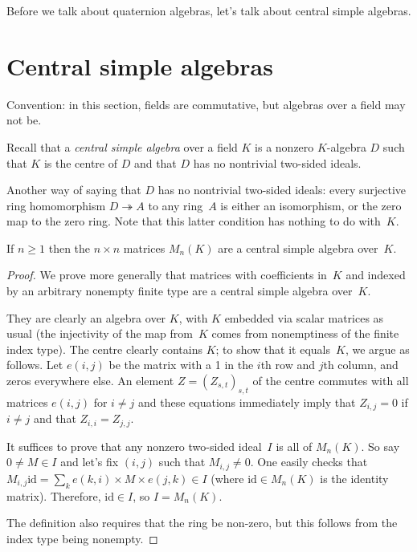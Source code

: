Before we talk about quaternion algebras, let's talk about central simple algebras.

\section{Central simple algebras}

Convention: in this section, fields are commutative, but algebras over a field may not be.

Recall that a \emph{central simple algebra} over a field $K$ is a
nonzero $K$-algebra $D$ such that $K$ is the
centre of $D$ and that $D$ has no nontrivial two-sided ideals.

Another way of saying that $D$ has no nontrivial two-sided ideals: every surjective ring
homomorphism $D\twoheadrightarrow A$ to any ring~$A$ is either an isomorphism, or the zero map
to the zero ring. Note that this latter condition
has nothing to do with~$K$.

\begin{lemma}
    \label{MatrixRing.isCentralSimple}
    \leanok
    If $n\geq1$ then the $n\times n$ matrices $M_n(K)$ are a central simple algebra over~$K$.
\end{lemma}
\begin{proof}
We prove more generally that matrices with coefficients in~$K$ and indexed by an arbitrary nonempty
finite type are a central simple algebra over~$K$.

They are clearly an algebra over $K$, with $K$ embedded via scalar matrices as usual
(the injectivity of the map from~$K$ comes from nonemptiness of the finite index type).
The centre clearly contains $K$; to show that it
equals~$K$, we argue as follows. Let $e(i,j)$ be the matrix with a 1 in the $i$th row and $j$th
column, and zeros everywhere else. An element $Z=(Z_{s,t})_{s,t}$ of the centre commutes with
all matrices $e(i,j)$ for $i\not=j$ and these equations immediately imply that $Z_{i,j}=0$ if
$i\not=j$ and that $Z_{i,i}=Z_{j,j}$.

It suffices to prove that any nonzero two-sided ideal~$I$ is all of $M_n(K)$. So say $0\not=M\in I$
and let's fix $(i,j)$ such that $M_{i,j}\not=0$. One easily checks that
$M_{i,j} \mathrm{id} = \sum_{k}e(k,i)\times M\times e(j,k)\in I$ (where $\mathrm{id} \in M_n(K)$
is the identity matrix). Therefore, $\mathrm{id} \in I$, so $I = M_n(K)$.

The definition also requires that the ring be non-zero, but this follows from the index type being
nonempty.
\end{proof}

